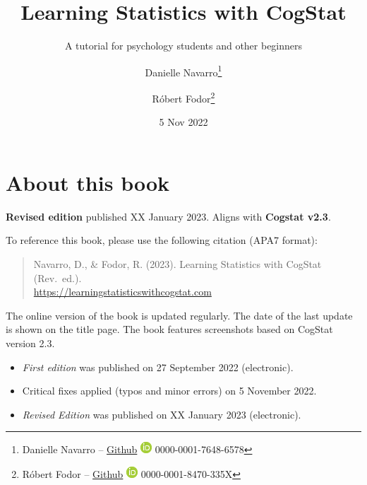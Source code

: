\documentclass[
  11pt,
]{book}
\title{Learning Statistics with CogStat}
\subtitle{A tutorial for psychology students and other beginners}
\author{Danielle Navarro\footnote{Danielle Navarro -- \href{https://github.com/djnavarro/}{Github} \textbar{} \href{https://orcid.org/0000-0001-7648-6578}{\includegraphics{resources/image/orcid_16x16.png}} 0000-0001-7648-6578} \and Róbert Fodor\footnote{Róbert Fodor -- \href{https://github.com/robertfodor/}{Github} \textbar{} \href{https://orcid.org/0000-0001-8470-335X}{\includegraphics{resources/image/orcid_16x16.png}} 0000-0001-8470-335X}}
\date{5 Nov 2022}
\providecommand{\tightlist}{%
  \setlength{\itemsep}{0pt}\setlength{\parskip}{0pt}}
\let\oldmaketitle\maketitle
\theoremstyle{definition}
\theoremstyle{definition}
\theoremstyle{definition}
\theoremstyle{definition}
\theoremstyle{remark}
\begin{document}
\maketitle

\frontmatter
{} %

\newpage
\let\maketitle\oldmaketitle
\maketitle
{} %
\setcounter{page}{1}

\mainmatter
{}

{
\hypersetup{linkcolor=black}
\setcounter{tocdepth}{1}
\tableofcontents
}
\hypertarget{about-this-book}{%
\chapter*{About this book}\label{about-this-book}}

\textbf{Revised edition} published XX January 2023. Aligns with \textbf{Cogstat v2.3}.

To reference this book, please use the following citation (APA7 format):

\begin{quote}
Navarro, D., \& Fodor, R. (2023). Learning Statistics with CogStat (Rev.~ed.).\\
\url{https://learningstatisticswithcogstat.com}
\end{quote}

The online version of the book is updated regularly. The date of the last update is shown on the title page. The book features screenshots based on CogStat version 2.3.

\begin{itemize}
\tightlist
\item
  \emph{First edition} was published on 27 September 2022 (electronic).
\item
  Critical fixes applied (typos and minor errors) on 5 November 2022.
\item
  \emph{Revised Edition} was published on XX January 2023 (electronic).
\end{itemize}
\end{document}
